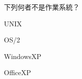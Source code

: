 \ifx\ntpcNinetyThree\undefined[93學年基北區] \fi
下列何者不是作業系統？
  \begin{optionlist}
  \item UNIX
  \item OS/2
  \item WindowsXP
  \item OfficeXP\label{ntpc-93-a28}
  \end{optionlist}